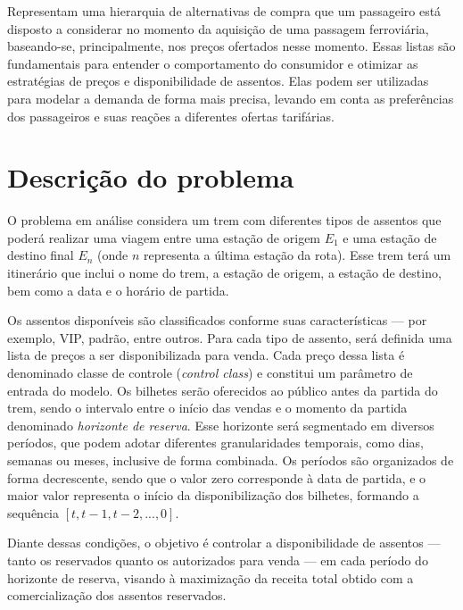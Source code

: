 \begin{description}[style=unboxed, leftmargin=0cm]
	\item[Listas de preferência:] Representam uma hierarquia de alternativas de compra que um passageiro está disposto a considerar no momento da aquisição de uma passagem ferroviária, baseando-se, principalmente, nos preços ofertados nesse momento. Essas listas são fundamentais para entender o comportamento do consumidor e otimizar as estratégias de preços e disponibilidade de assentos. Elas podem ser utilizadas para modelar a demanda de forma mais precisa, levando em conta as preferências dos passageiros e suas reações a diferentes ofertas tarifárias.
\end{description}





\section{Descrição do problema}
O problema em análise considera um trem com diferentes tipos de assentos que poderá realizar uma viagem entre uma estação de origem \( E_1 \) e uma estação de destino final \( E_n \) (onde \( n \) representa a última estação da rota). Esse trem terá um itinerário que inclui o nome do trem, a estação de origem, a estação de destino, bem como a data e o horário de partida.

Os assentos disponíveis são classificados conforme suas características — por exemplo, VIP, padrão, entre outros. Para cada tipo de assento, será definida uma lista de preços a ser disponibilizada para venda. Cada preço dessa lista é denominado classe de controle (\textit{control class}) e constitui um parâmetro de entrada do modelo. Os bilhetes serão oferecidos ao público antes da partida do trem, sendo o intervalo entre o início das vendas e o momento da partida denominado \textit{horizonte de reserva}. Esse horizonte será segmentado em diversos períodos, que podem adotar diferentes granularidades temporais, como dias, semanas ou meses, inclusive de forma combinada. Os períodos são organizados de forma decrescente, sendo que o valor zero corresponde à data de partida, e o maior valor representa o início da disponibilização dos bilhetes, formando a sequência \( [t, t-1, t-2, ..., 0] \).

Diante dessas condições, o objetivo é controlar a disponibilidade de assentos — tanto os reservados quanto os autorizados para venda — em cada período do horizonte de reserva, visando à maximização da receita total obtido com a comercialização dos assentos reservados.


